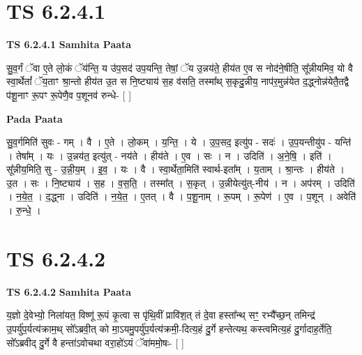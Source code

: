 \documentclass[17pt]{extarticle}
\begin{document}
\section*{ TS 6.2.4.1 }

\textbf{TS 6.2.4.1 } \newline
\textbf{Samhita Paata} \newline

सु॒व॒र्गं ॅवा ए॒ते लो॒कं ॅय॑न्ति॒ य उ॑प॒सद॑ उप॒यन्ति॒ तेषां॒ ॅय उ॒न्नय॑ते॒ हीय॑त ए॒व स नोद॑ने॒षीति॒ सू᳚न्नीयमिव॒ यो वै स्वा॒र्थेतां᳚ ॅय॒ताꣳ श्रा॒न्तो हीय॑त उ॒त स नि॒ष्ट्याय॑ स॒ह व॑सति॒ तस्मा᳚थ् स॒कृदु॒न्नीय॒ नाप॑र॒मुन्न॑येत द॒द्ध्नोन्न॑येतै॒तद्वै प॑शू॒नाꣳ रू॒पꣳ रू॒पेणै॒व प॒शूनव॑ रुन्धे- [  ] \newline

\textbf{Pada Paata} \newline

सु॒व॒र्गमिति॑ सुवः - गम् । वै । ए॒ते । लो॒कम् । य॒न्ति॒ । ये । उ॒प॒सद॒ इत्यु॑प - सदः॑ । उ॒प॒यन्तीयु॑प - यन्ति॑ । तेषा᳚म् । यः । उ॒न्नय॑त॒ इत्यु॑त् - नय॑ते । हीय॑ते । ए॒व । सः । न । उदिति॑ । अ॒ने॒षि॒ । इति॑ । सू᳚न्नीय॒मिति॒ सु - उ॒न्नी॒य॒म् । इ॒व॒ । यः । वै । स्वा॒र्थेता॒मिति॑ स्वार्थ-इता᳚म् । य॒ताम् । श्रा॒न्तः । हीय॑ते । उ॒त । सः । नि॒ष्ट्याय॑ । स॒ह । व॒स॒ति॒ । तस्मा᳚त् । स॒कृत् । उ॒न्नीयेत्यु॑त्-नीय॑ । न । अप॑रम् । उदिति॑ । न॒ये॒त॒ । द॒द्ध्ना । उदिति॑ । न॒ये॒त॒ । ए॒तत् । वै । प॒शू॒नाम् । रू॒पम् । रू॒पेण॑ । ए॒व । प॒शून् । अवेति॑ । रु॒न्धे॒ ।  \newline




\section*{ TS 6.2.4.2 }

\textbf{TS 6.2.4.2 } \newline
\textbf{Samhita Paata} \newline

य॒ज्ञो दे॒वेभ्यो॒ निला॑यत॒ विष्णू॑ रू॒पं कृ॒त्वा स पृ॑थि॒वीं प्रावि॑श॒त् तं दे॒वा हस्ता᳚न्थ् सꣳ॒॒ रभ्यै᳚च्छ॒न् तमिन्द्र॑ उ॒पर्यु॑प॒र्यत्य॑क्राम॒थ् सो᳚ऽब्रवी॒त् को मा॒ऽयमु॒पर्यु॑प॒र्यत्य॑क्रमी॒-दित्य॒हं दु॒र्गे हन्तेत्यथ॒ कस्त्वमित्य॒हं दु॒र्गादाह॒र्तेति॒ सो᳚ऽब्रवीद् दु॒र्गे वै हन्ता॑ऽवोचथा वरा॒हो॑ऽयं ॅवा॑ममो॒षः- [  ] \newline
\end{document}
